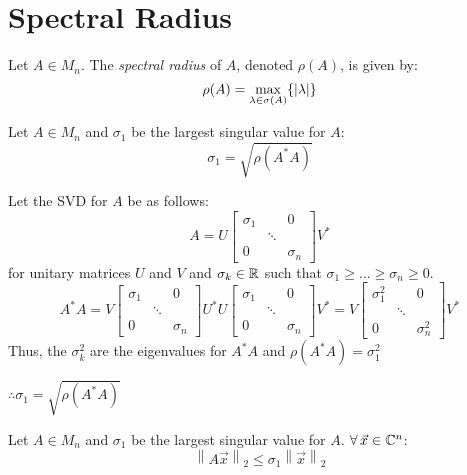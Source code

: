 \documentclass[letterpaper,12pt,fleqn]{article}
\renewcommand{\r}{\rho}
\renewcommand{\l}{\lambda}
\renewcommand{\o}{\sigma}
\newcommand{\vx}{\vec{x}}
\newcommand{\norm}[1]{\left\lVert#1\right\rVert}
\begin{document}
\section*{Spectral Radius}

\begin{definition}
  Let $A\in M_n$. The \emph{spectral radius} of $A$, denoted $\r(A)$, is given
  by:
  \[\rho(A)=\max_{\l\in\o(A)}\{\abs{\l}\}\]
\end{definition}

\begin{lemma}
  Let $A\in M_n$ and $\o_1$ be the largest singular value for $A$:
  \[\o_1=\sqrt{\r(A^*A)}\]
\end{lemma}

\begin{theproof}
  Let the SVD for $A$ be as follows:
  \[A=U\begin{bmatrix} \o_1 & & 0 \\ & \ddots & \\ 0 & & \o_n
  \end{bmatrix}V^*\]
  for unitary matrices $U$ and $V$ and $\o_k\in\R$ such that
  $\o_1\ge\ldots\ge\o_n\ge0$.
  \[A^*A=V\begin{bmatrix} \o_1 & & 0 \\ & \ddots & \\ 0 & & \o_n
  \end{bmatrix}U^*U\begin{bmatrix} \o_1 & & 0 \\ & \ddots & \\ 0 & & \o_n
  \end{bmatrix}V^*=V\begin{bmatrix} \o_1^2 & & 0 \\ & \ddots & \\ 0 & & \o_n^2
  \end{bmatrix}V^*\]
  Thus, the $\o_k^2$ are the eigenvalues for $A^*A$ and $\r(A^*A)=\o_1^2$

  $\therefore\o_1=\sqrt{\r(A^*A)}$
\end{theproof}

\begin{lemma}
  Let $A\in M_n$ and $\o_1$ be the largest singular value for $A$.
  $\forall\,\vx\in\C^n$:
  \[\norm{A\vx}_2\le\o_1\norm{\vx}_2\]
\end{lemma}
\end{document}
